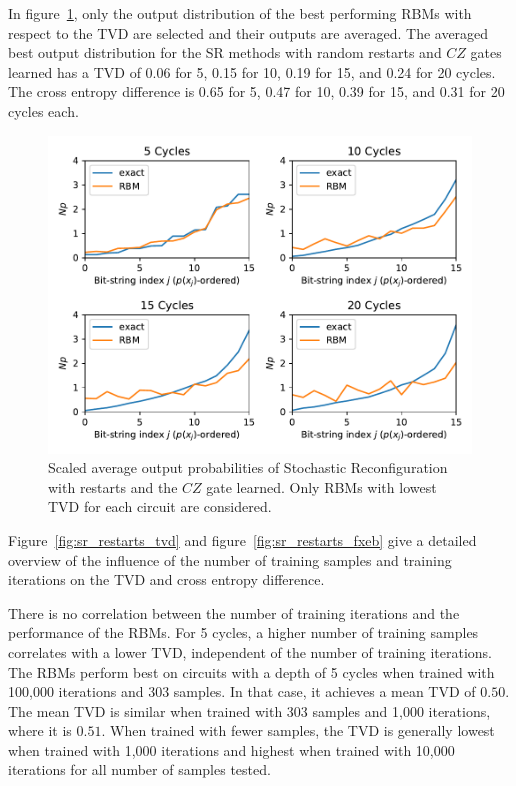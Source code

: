 In figure~\ref{fig:sr_restarts_bestPDF}, only the output distribution of the best performing RBMs with respect to the 
TVD are selected and their outputs are averaged. The averaged best output distribution for the SR methods with 
random restarts and $CZ$ gates learned has a TVD of 0.06 for 5, 0.15 for 10, 0.19 for 15, and 0.24 for 20
cycles. The cross entropy difference is 0.65 for 5, 0.47 for 10, 0.39 for 15, and 0.31 for 20 cycles each. 

\begin{figure}[H]
  \centering
  \includegraphics[width=\textwidth]{figures/results/SR-restarts-learned/avgBestPDF.pdf}
  \caption[Scaled Average Output Probabilities of Best Performing RBMs Trained with Stochastic Reconfiguration with Random Restarts and $CZ$ Gates Learned]{
    Scaled average output probabilities of Stochastic Reconfiguration with restarts and the $CZ$ gate learned. Only RBMs with lowest
    TVD for each circuit are considered.}
  \label{fig:sr_restarts_bestPDF}
\end{figure}

Figure~\ref{fig:sr_restarts_tvd} and figure~\ref{fig:sr_restarts_fxeb} give a detailed overview of the influence of the 
number of training samples and training iterations on the TVD and cross entropy difference. 

There is no correlation between the number of training
iterations and the performance of the RBMs. For 5 cycles, a higher number of training samples correlates
with a lower TVD, independent of the number of training iterations. The RBMs perform best on 
circuits with a depth of 5 cycles when trained with 100,000 iterations and 303 samples. In that case, 
it achieves a mean TVD of $0.50$. The mean TVD is similar when trained with 303 samples and 1,000 iterations, 
where it is $0.51$. When trained with fewer samples, the TVD is generally lowest when trained with 1,000 
iterations and highest when trained with 10,000 iterations for all number of samples tested. 

